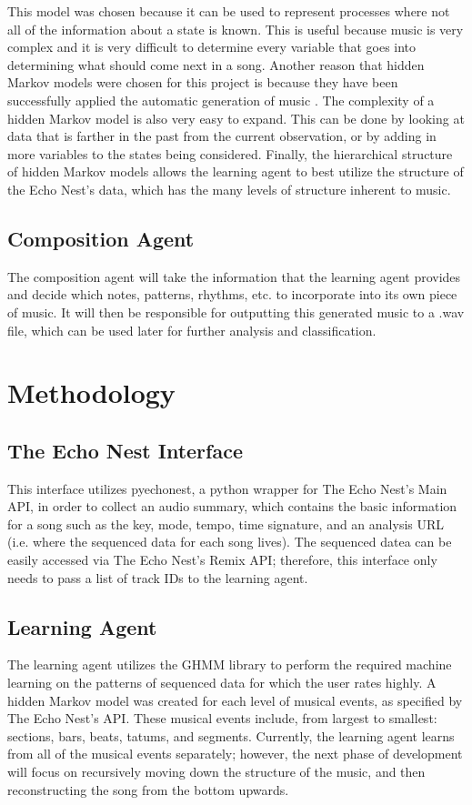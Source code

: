 \documentclass{article}
\begin{document}
This model was chosen because it can be used to represent processes where not all of the information about 
a state is known. This is useful because music is very complex and it is very difficult to determine every
variable that goes into determining what should come next in a song. Another reason that hidden Markov 
models were chosen for this project is because they have been successfully applied the automatic generation
of music \cite{5492670}. The complexity of a hidden Markov model is also very easy to expand. This can be 
done by looking at data that is farther in the past from the current observation, or by adding in more
variables to the states being considered. Finally, the hierarchical structure of hidden Markov models allows
the learning agent to best utilize the structure of the Echo Nest's data, which has the many levels of 
structure inherent to music.

\subsection{Composition Agent}
The composition agent will take the information that the learning agent provides and decide which notes,
patterns, rhythms, etc. to incorporate into its own piece of music. It will then be responsible for outputting
this generated music to a .wav file, which can be used later for further analysis and classification.

\section{Methodology}
\subsection{The Echo Nest Interface}
This interface utilizes pyechonest, a python wrapper for The Echo Nest's Main API, in order to collect an 
audio summary, which contains the basic information for a song such as the key, mode, tempo, time signature, 
and an analysis URL (i.e. where the sequenced data for each song lives). The sequenced datea
can be easily accessed via The Echo Nest's Remix API; therefore, this interface only needs to pass a list of
track IDs to the learning agent.

\subsection{Learning Agent}
The learning agent utilizes the GHMM library to perform the required machine learning on the patterns of
sequenced data for which the user rates highly. A hidden Markov model was created for each level of musical 
events, as specified by The Echo Nest's API. These musical events include, from largest to smallest:
sections, bars, beats, tatums, and segments. Currently, the learning agent learns from all of the musical
events separately; however, the next phase of development will focus on recursively moving down the structure
of the music, and then reconstructing the song from the bottom upwards.
\end{document}

